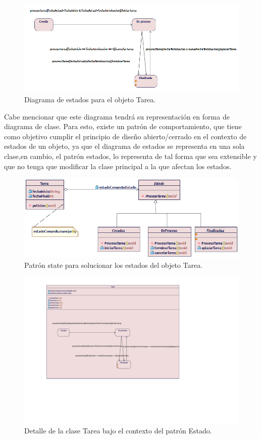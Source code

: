 \begin{figure}[H]
	\centering
	\includegraphics[width=1\linewidth]{diseno/estados/imgs/estadosTarea}
	\caption{Diagrama de estados para el objeto Tarea.}
	\label{fig:gantt}
\end{figure}

Cabe mencionar que este diagrama tendrá su representación en forma de diagrama de clase. Para esto, existe un patrón de comportamiento, que tiene como objetivo cumplir el principio de diseño abierto/cerrado en el contexto de estados de un objeto, ya que el diagrama de estados se representa en una sola clase,en cambio, el patrón estados, lo representa de tal forma que sea extensible y que no tenga que modificar la clase principal a la que afectan los estados. 

\begin{figure}[H]
	\centering
	\includegraphics[width=1\linewidth]{diseno/estados/imgs/PatronState}
	\caption{Patrón state para solucionar los estados del objeto Tarea.}
	\label{fig:gantt}
\end{figure}

\begin{figure}[H]
	\centering
	\includegraphics[width=1\linewidth]{diseno/estados/imgs/loquesea.pdf}
	\caption{Detalle de la clase Tarea bajo el contexto del patrón Estado.}
	\label{fig:gantt}
\end{figure}